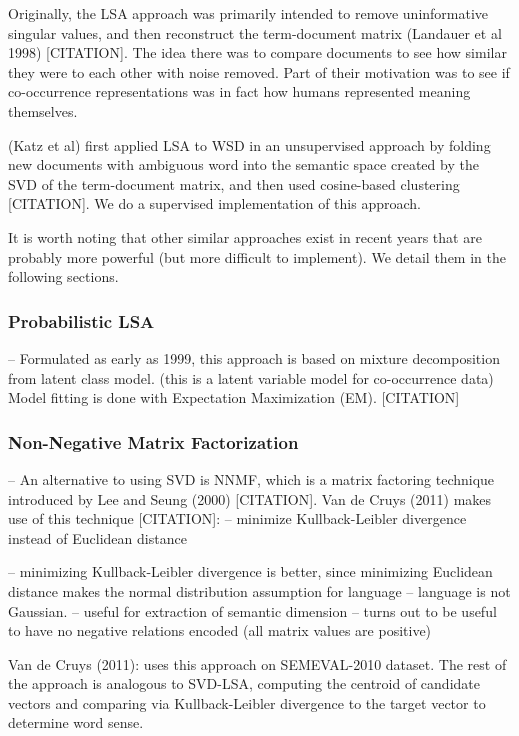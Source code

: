 \documentclass[10pt, letterpaper]{article}
\begin{document}
	Originally, the LSA approach was primarily intended to remove uninformative singular values, and then reconstruct the term-document matrix (Landauer et al 1998) [CITATION].  The idea there was to compare documents to see how similar they were to each other with noise removed. Part of their motivation was to see if co-occurrence representations was in fact how humans represented meaning themselves.

	(Katz et al) first applied LSA to WSD in an unsupervised approach by folding new documents with ambiguous word into the semantic space created by the SVD of the term-document matrix, and then used cosine-based clustering [CITATION]. We do a supervised implementation of this approach. 

	It is worth noting that other similar approaches exist in recent years that are probably more powerful (but more difficult to implement). We detail them in the following sections. 

	\subsubsection{Probabilistic LSA}

	-- Formulated as early as 1999, this approach is based on mixture decomposition from latent class model. 
	(this is a latent variable model for co-occurrence data)
	Model fitting is done with Expectation Maximization (EM). [CITATION]

	\subsubsection{Non-Negative Matrix Factorization}
	-- An alternative to using SVD is NNMF, which is a matrix factoring technique introduced by Lee and Seung  (2000) [CITATION].  Van de Cruys (2011) makes use of this technique [CITATION]:
	-- minimize Kullback-Leibler divergence instead of Euclidean distance

	-- minimizing Kullback-Leibler divergence is better, since minimizing Euclidean distance makes the normal distribution assumption for language -- language is not Gaussian.
	-- useful for extraction of semantic dimension 
	-- turns out to be useful to have no negative relations encoded (all matrix values are positive)

	Van de Cruys (2011): uses this approach on SEMEVAL-2010 dataset. The rest of the approach is analogous to SVD-LSA, computing the centroid  of candidate vectors and comparing via Kullback-Leibler divergence to the target vector to determine word sense. 
\end{document}

